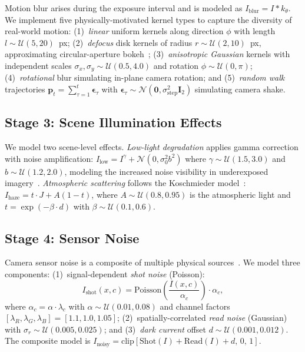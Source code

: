 Motion blur arises during the exposure interval and is modeled as $I_{\text{blur}} = I \ast k_\theta$.
We implement five physically-motivated kernel types to capture the diversity of real-world motion:
(1)~\textit{linear} uniform kernels along direction $\phi$ with length $l \sim \mathcal{U}(5, 20)$~px;
(2)~\textit{defocus} disk kernels of radius $r \sim \mathcal{U}(2, 10)$~px, approximating circular-aperture bokeh~\cite{potmesil1981lens};
(3)~\textit{anisotropic Gaussian} kernels with independent scales $\sigma_x, \sigma_y \sim \mathcal{U}(0.5, 4.0)$ and rotation $\phi \sim \mathcal{U}(0, \pi)$;
(4)~\textit{rotational} blur simulating in-plane camera rotation; and
(5)~\textit{random walk} trajectories $\mathbf{p}_t = \sum_{\tau=1}^{t} \boldsymbol{\epsilon}_\tau$ with $\boldsymbol{\epsilon}_\tau \sim \mathcal{N}(\mathbf{0}, \sigma_{\text{step}}^2 \mathbf{I}_2)$ simulating camera shake.

\subsection{Stage 3: Scene Illumination Effects}
\label{sec:pipeline_scene}

We model two scene-level effects.
\textit{Low-light degradation} applies gamma correction with noise amplification: $I_{\text{low}} = I^\gamma + \mathcal{N}(0, \sigma_0^2 b^2)$ where $\gamma \sim \mathcal{U}(1.5, 3.0)$ and $b \sim \mathcal{U}(1.2, 2.0)$, modeling the increased noise visibility in underexposed imagery~\cite{chen2018learning}.
\textit{Atmospheric scattering} follows the Koschmieder model~\cite{mccartney1976optics}: $I_{\text{haze}} = t \cdot J + A(1 - t)$, where $A \sim \mathcal{U}(0.8, 0.95)$ is the atmospheric light and $t = \exp(-\beta \cdot d)$ with $\beta \sim \mathcal{U}(0.1, 0.6)$.

\subsection{Stage 4: Sensor Noise}
\label{sec:pipeline_sensor}

Camera sensor noise is a composite of multiple physical sources~\cite{healey1994radiometric,foi2008practical}.
We model three components: (1)~signal-dependent \textit{shot noise} (Poisson):
\begin{equation}
    I_{\text{shot}}(x, c) = \text{Poisson}\!\left(\frac{I(x, c)}{\alpha_c}\right) \cdot \alpha_c,
    \label{eq:shot_noise}
\end{equation}
where $\alpha_c = \alpha \cdot \lambda_c$ with $\alpha \sim \mathcal{U}(0.01, 0.08)$ and channel factors $[\lambda_R, \lambda_G, \lambda_B] = [1.1, 1.0, 1.05]$;
(2)~spatially-correlated \textit{read noise} (Gaussian) with $\sigma_r \sim \mathcal{U}(0.005, 0.025)$; and
(3)~\textit{dark current} offset $d \sim \mathcal{U}(0.001, 0.012)$.
The composite model is $I_{\text{noisy}} = \text{clip}[\text{Shot}(I) + \text{Read}(I) + d,\, 0,\, 1]$.

